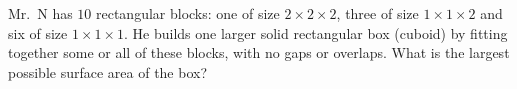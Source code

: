 Mr.~N has $10$ rectangular blocks: one of size $2\times2\times2$, three of size $1\times1\times2$ and six of size $1\times1\times1$. He builds one larger solid rectangular box (cuboid) by fitting together some or all of these blocks, with no gaps or overlaps. What is the largest possible surface area of the box?
